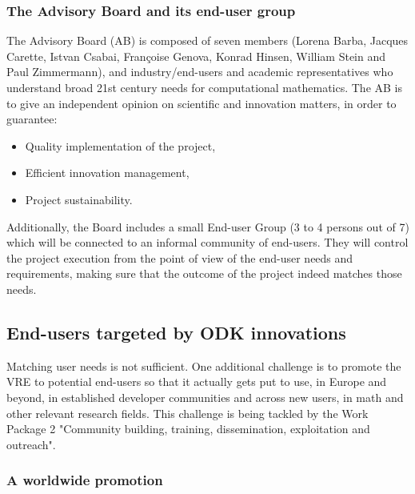 \documentclass{deliverablereport}
\begin{document}
\subsubsection{The Advisory Board and its end-user group}

The Advisory Board (AB) is composed of seven members (Lorena Barba, Jacques Carette,
Istvan Csabai, Françoise Genova, Konrad Hinsen, William Stein and Paul
Zimmermann), and industry/end-users and academic representatives who
understand broad 21st century needs for computational mathematics.
The AB is to give an independent opinion on scientific and innovation
matters, in order to guarantee:

\begin{itemize}
\item Quality implementation of the project,
\item Efficient innovation management,
\item Project sustainability.
\end{itemize}

Additionally, the Board includes a small End-user Group (3 to 4 persons out
of 7) which will be connected to an informal community of
end-users. They will control the project execution from the point of
view of the end-user needs and requirements, making sure that the
outcome of the project indeed matches those needs.

\subsection{End-users targeted by ODK innovations}

Matching user needs is not sufficient. One additional challenge is to
promote the VRE to potential end-users so that it actually gets put to
use, in Europe and beyond, in established developer communities and
across new users, in math and other relevant research fields. This
challenge is being tackled by the Work Package 2 "Community building,
training, dissemination, exploitation and outreach".


\subsubsection{A worldwide promotion}
\end{document}
